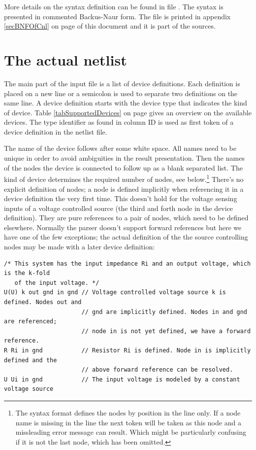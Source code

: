 More details on the syntax definition can be found in file
. The syntax is presented in commented
Backus-Naur form. The file is printed in appendix \ref{secBNFOfCnl} on
page \pageref{secBNFOfCnl} of this document and it is part of the
\linnet{} sources.


\section{The actual netlist}

The main part of the input file is a list of device definitions. Each
definition is placed on a new line or a semicolon is used to separate two
definitions on the same line. A device definition starts with the device
type that indicates the kind of device. Table \ref{tabSupportedDevices} on
page \pageref{tabSupportedDevices} gives an overview on the available
devices. The type identifier as found in column ID is used as first token
of a device definition in the netlist file.

The name of the device follows after some white space. All names need to
be unique in order to avoid ambiguities in the result presentation. Then
the names of the nodes the device is connected to follow up as a blank
separated list. The kind of device determines the required number of
nodes, see below.\footnote{The syntax format defines the nodes by position
in the line only. If a node name is missing in the line the next token
will be taken as this node and a missleading error message can result.
Which might be particularly confusing if it is not the last node, which
has been omitted.} There's no explicit definition of nodes; a node is
defined implicitly when referencing it in a device definition the very
first time. This doesn't hold for the voltage sensing inputs of a voltage
controlled source (the third and forth node in the device definition).
They are pure references to a pair of nodes, which need to be defined
elsewhere. Normally the parser doesn't support forward references but here
we have one of the few exceptions; the actual definition of the the source
controlling nodes may be made with a later device definition:

\begin{verbatim}
/* This system has the input impedance Ri and an output voltage, which is the k-fold
   of the input voltage. */
U(U) k out gnd in gnd // Voltage controlled voltage source k is defined. Nodes out and
                      // gnd are implicitly defined. Nodes in and gnd are referenced;
                      // node in is not yet defined, we have a forward reference.
R Ri in gnd           // Resistor Ri is defined. Node in is implicitly defined and the
                      // above forward reference can be resolved.
U Ui in gnd           // The input voltage is modeled by a constant voltage source
\end{verbatim}

